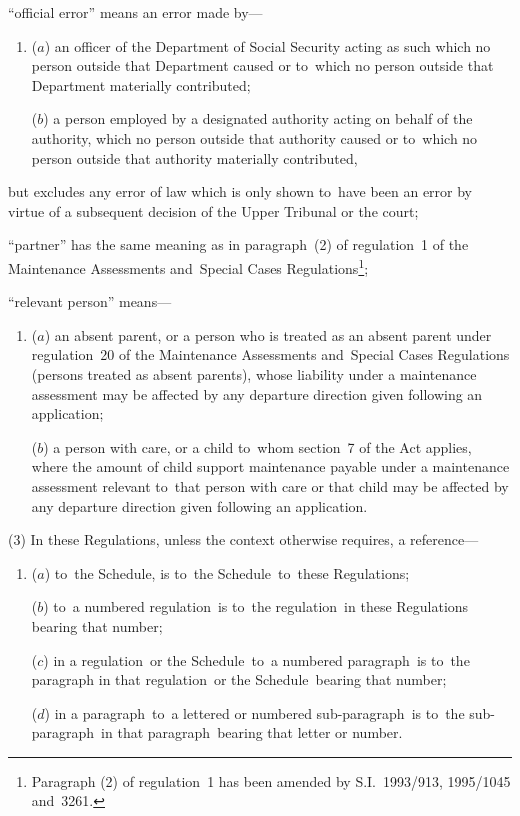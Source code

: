 \documentclass[12pt,a4paper]{article}
\begin{document}
\begin{enumerate}
“official error” means an error made by—
\begin{enumerate}\item[]
    ($a$) 
    an officer of the Department of Social Security acting as such which no person outside that Department caused or to~which no person outside that Department materially contributed;


($b$) a person employed by a designated authority acting on behalf of the authority, which no person outside that authority caused or to~which no person outside that authority materially contributed,
\end{enumerate}
but excludes any error of law which is only shown to~have been an error by virtue of a subsequent decision of 
the Upper Tribunal  %
or the court;

“partner” has the same meaning as in paragraph~(2) of regulation~1 of the
Maintenance Assessments and~Special Cases Regulations\footnote{\frenchspacing Paragraph (2) of regulation~1 has been amended by S.I.~1993/913, 1995/1045 and~3261.};

“relevant person” means—
\begin{enumerate}\item[]
($a$) an absent parent, or a person who is treated as an absent parent under
regulation~20 of the Maintenance Assessments and~Special Cases Regulations
(persons treated as absent parents), whose liability under a maintenance
assessment may be affected by any departure direction given following an
application;

($b$) a person with care, or a child to~whom section~7 of the Act applies, where
the amount of child support maintenance payable under a maintenance assessment
relevant to~that person with care or that child may be affected by any departure
direction given following an application.
\end{enumerate}
\end{enumerate}

(3) In these Regulations, unless the context otherwise requires, a reference—
\begin{enumerate}\item[]
($a$) to~the Schedule, is to~the Schedule~to~these Regulations;

($b$) to~a numbered regulation~is to~the regulation~in these Regulations bearing
that number;

($c$) in a regulation~or the Schedule~to~a numbered paragraph~is to~the paragraph
in that regulation~or the Schedule~bearing that number;

($d$) in a paragraph~to~a lettered or numbered sub-paragraph~is to~the
sub-paragraph~in that paragraph~bearing that letter or number.
\end{enumerate}
\end{document}
